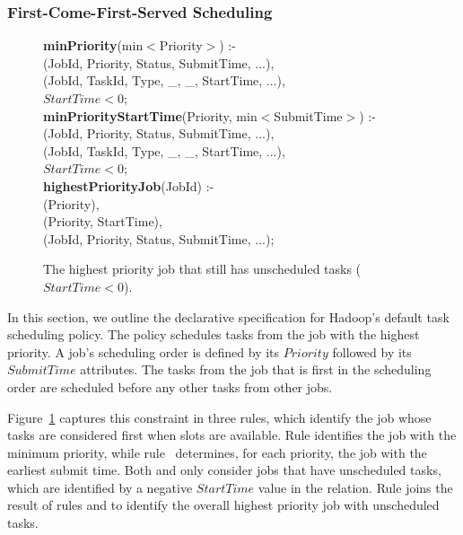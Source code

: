 \subsubsection{First-Come-First-Served Scheduling}

\begin{figure}
\label{fig:joborder}
\ssp
\centering
\begin{boxedminipage}{\linewidth}
 {\bf minPriority}(min$<$Priority$>$) :- \\
(JobId, Priority, Status, SubmitTime, ...), \\
(JobId, TaskId, Type, \_, \_, StartTime, ...), \\
\datalogspace $StartTime < 0$; \\
	
 {\bf minPriorityStartTime}(Priority, min$<$SubmitTime$>$) :- \\
(JobId, Priority, Status, SubmitTime, ...), \\
(JobId, TaskId, Type, \_, \_, StartTime, ...), \\
\datalogspace $StartTime < 0$; \\

 {\bf highestPriorityJob}(JobId) :- \\
(Priority), \\
(Priority, StartTime), \\
(JobId, Priority, Status, SubmitTime, ...); \\
\end{boxedminipage}
\caption{\label{ch:boom:fig:joborder}The highest priority job that still has unscheduled tasks ($StartTime < 0$).}
\end{figure}

In this section, we outline the declarative specification for Hadoop's default
task scheduling policy.  The policy schedules tasks from the job with the
highest priority.  A job's scheduling order is defined by its $Priority$
followed by its $SubmitTime$ attributes.  The tasks from the job that is first
in the scheduling order are scheduled before any other tasks from other jobs.

Figure~\ref{ch:boom:fig:joborder} captures this constraint in three rules, which
identify the job whose tasks are considered first when \TT slots are available.
Rule  identifies the job with the minimum priority, while rule~
determines, for each priority, the job with the earliest submit time.  Both
 and  only consider jobs that have unscheduled tasks, which are
identified by a negative $StartTime$ value in the  relation.  Rule
 joins the result of rules  and  to identify the overall
highest priority job with unscheduled tasks.

